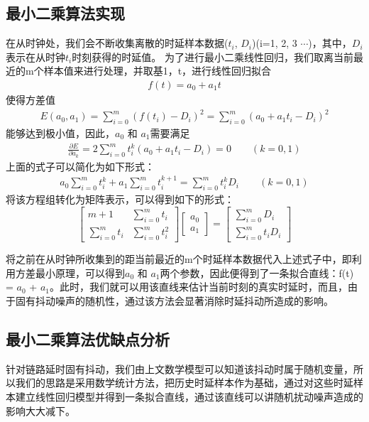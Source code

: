 \subsection{最小二乘算法实现}
在从时钟处，我们会不断收集离散的时延样本数据($t_{i}$, $D_{i}$)(i=1, 2, 3 $\cdots$)，其中，$D_{i}$表示在从时钟$t_{i}$时刻获得的时延值。
为了进行最小二乘线性回归，我们取离当前最近的m个样本值来进行处理，并取基1，t，进行线性回归拟合
\begin {align}
f(t) = a_{0} + a_{1}t
\end{align}
使得方差值
\begin{align}
E(a_{0}, a_{1}) = \sum_{i=0}^{m}(f(t_{i}) - D_{i})^{2}
	= \sum_{i=0}^{m}(a_{0} + a_{1}t_{i} - D_{i})^{2}
\end{align}
能够达到极小值，因此，$a_{0}$ 和 $a_{1}$需要满足
\begin{align}
	\frac{\partial E}{\partial a_{k}} = 2 \sum_{i=0}^{m}t_{i}^{k}(a_{0} + a_{1}t_{i} - D_{i}) = 0
	\qquad(k = 0, 1)
\end{align}
上面的式子可以简化为如下形式：
\begin{align}
	a_{0}\sum_{i=0}^{m}t_{i}^{k} + a_{1}\sum_{i=0}^{m}t_{i}^{k+1} = \sum_{i=0}^{m}t_{i}^{k}D_{i}
	\qquad(k = 0, 1)
\end{align}
将该方程组转化为矩阵表示，可以得到如下的形式：
\begin{equation}
	\begin{bmatrix}
		m+1 & \sum_{i=0}^{m}t_{i} \\ 
		\sum_{i=0}^{m}t_{i} & \sum_{i=0}^{m}t_{i}^{2}
	\end{bmatrix}
	\begin{bmatrix}
	a_{0} \\ a_{1}
	\end{bmatrix}
	=
	\begin{bmatrix}
	 \sum_{i=0}^{m}D_{i} \\ \sum_{i=0}^{m}t_{i}D_{i}
	\end{bmatrix}
\end{equation}

将之前在从时钟所收集到的距当前最近的m个时延样本数据代入上述式子中，即利用方差最小原理，可以得到$a_{0}$ 和 $a_{1}$两个参数，因此便得到了一条拟合直线：f(t) = $a_{0}$ + $a_{1}$。此时，我们就可以用该直线来估计当前时刻的真实时延时，而且，由于固有抖动噪声的随机性，通过该方法会显著消除时延抖动所造成的影响。

\subsection{最小二乘算法优缺点分析}
针对链路延时固有抖动，我们由上文数学模型可以知道该抖动时属于随机变量，所以我们的思路是采用数学统计方法，把历史时延样本作为基础，通过对这些时延样本建立线性回归模型并得到一条拟合直线，通过该直线可以讲随机扰动噪声造成的影响大大减下。

